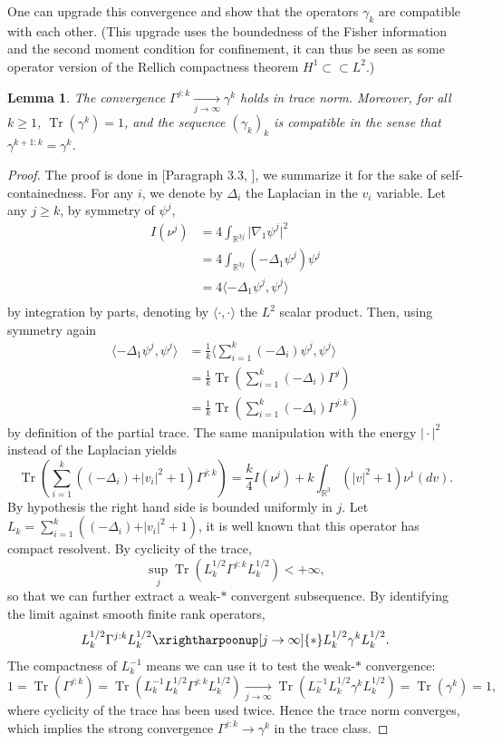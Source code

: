 \documentclass[11pt,a4paper]{article}
\theoremstyle{definition}
\theoremstyle{plain}
\newtheorem{lemma}[defi]{Lemma}
\DeclareMathOperator*{\Tr}{Tr}
\begin{document}
One can upgrade this convergence and show that the operators $\gamma_k$ are compatible with each other. (This upgrade uses the boundedness of the Fisher information and the second moment condition for confinement, it can thus be seen as some operator version of the Rellich compactness theorem $H^1\subset\subset L^2$.)
\begin{lemma}
\label{lem:gammakstrong}
    The convergence $\Gamma^{j:k}\xrightarrow[j\rightarrow\infty]{} \gamma^k$ holds in trace norm.
    Moreover, for all $k\geq 1$, $\Tr(\gamma^k)=1$, and the sequence $(\gamma_k)_k$ is compatible in the sense that
    $\gamma^{k+1:k}=\gamma^k$. 
\end{lemma}
\begin{proof}
    The proof is done in [Paragraph 3.3, \cite{Rougerie2020}], we summarize it for the sake of self-containedness. For any $i$, we denote by $\Delta_i$ the Laplacian in the $v_i$ variable. Let any $j\geq k$, by symmetry of $\psi^j$,
    \begin{align*}
        I(\nu^j)&=4\int_{\mathbb{R}^{3j}} \vert \nabla_1 \psi^j\vert^2\\
        &=4\int_{\mathbb{R}^{3j}} (-\Delta_1\psi^j) \psi^j \\
        &=4\langle -\Delta_1\psi^j,\psi^j \rangle\\
    \end{align*}
    by integration by parts, denoting by $\langle \cdot,\cdot\rangle$ the $L^2$ scalar product.
    Then, using symmetry again
    \begin{align*}
        \langle -\Delta_1\psi^j,\psi^j \rangle&=\frac{1}{k}\langle\sum_{i=1}^k(-\Delta_i)\psi^j,\psi^j \rangle\\
        &=\frac{1}{k}\Tr \left(\sum_{i=1}^k(-\Delta_i) \Gamma^j\right)\\
        &=\frac{1}{k}\Tr \left(\sum_{i=1}^k(-\Delta_i) \Gamma^{j:k}\right)
    \end{align*}
    by definition of the partial trace. The same manipulation with the energy $\vert \cdot\vert^2$ instead of the Laplacian yields
    $$\Tr \left(\sum_{i=1}^k\left((-\Delta_i) +\vert v_i\vert^2+1\right)\Gamma^{j:k}\right) = \frac{k}{4}I(\nu^j)+k\int_{\mathbb{R}^3} (\vert v \vert^2+1)\nu^1(dv).$$
    By hypothesis the right hand side is bounded uniformly in $j$. Let $L_k=\sum_{i=1}^k\left((-\Delta_i) +\vert v_i\vert^2+1\right)$, it is well known that this operator has compact resolvent. By cyclicity of the trace,
    $$\sup_j \Tr\left(L_k^{1/2}\Gamma^{j:k} L_k^{1/2}\right) <+\infty,$$
    so that we can further extract a weak-$*$ convergent subsequence. By identifying the limit against smooth finite rank operators,
    $$L_k^{1/2}\Gamma^{j:k} L_k^{1/2}\xrightharpoonup[j\rightarrow \infty]{*} L_k^{1/2}\gamma^{k} L_k^{1/2}.$$
    The compactness of $L_k^{-1}$ means we can use it to test the weak-$*$ convergence:
    $$1=\Tr(\Gamma^{j:k})=\Tr\left(L_k^{-1} L_k^{1/2}\Gamma^{j:k} L_k^{1/2}\right)\xrightarrow[j\rightarrow \infty]{}\Tr\left(L_k^{-1} L_k^{1/2}\gamma^{k} L_k^{1/2}\right)=\Tr(\gamma^k)=1,$$
    where cyclicity of the trace has been used twice. Hence the trace norm converges, which implies the strong convergence $\Gamma^{j:k}\rightarrow\gamma^k$ in the trace class.


\end{proof}
\end{document}
